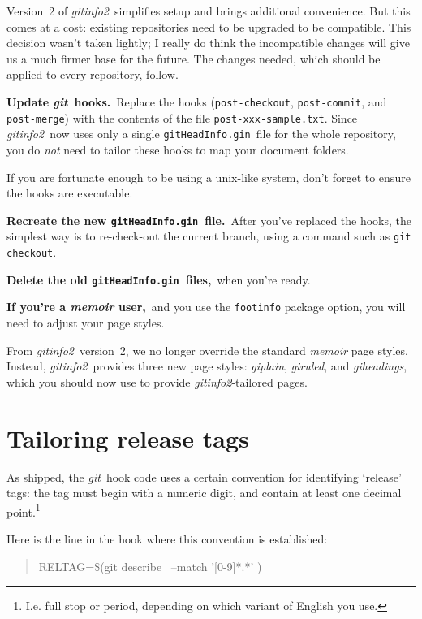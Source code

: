 \documentclass[a4paper,12pt,twoside,openany]{memoir}
\newcommand{\bpara}[1]{\par\vspace{\beforeparaskip}\noindent\textbf{#1}\,}
\newcommand{\sfit}[1]{\textit{#1}}
\newcommand{\git}{\sfit{git}}
\newcommand{\tpname}{\sfit{gitinfo2}}
\newcommand{\ginname}{gitHeadInfo.gin}
\newcommand{\metaname}{\texttt{\ginname}}
\begin{document}
Version~2 of \tpname\ simplifies setup and brings additional convenience.
But this comes at a cost:
existing repositories need to be upgraded to be compatible.
This decision wasn't taken lightly; I really do think the incompatible changes
will give us a much firmer base for the future.
The changes needed, which should be applied to every repository, follow.

\bpara{Update \git\ hooks.}
Replace the hooks (\texttt{post-checkout}, \texttt{post-commit},
and \texttt{post-merge}) with the contents of the file \texttt{post-xxx-sample.txt}.
Since \tpname\ now uses only a single \metaname\ file for the whole repository,
you do \emph{not} need to tailor these hooks to map your document folders.

If you are fortunate enough to be using a unix-like system,
don't forget to ensure the hooks are executable.

\bpara{Recreate the new \metaname\ file.}
After you've replaced the hooks, the simplest way is to re-check-out the current branch,
using a command such as \verb!git checkout!.

\bpara{Delete the old \metaname\ files,}
when you're ready.

\bpara{If you're a \sfit{memoir} user,}
and you use the \texttt{footinfo} package option,
you will need to adjust your page styles.

From \tpname\ version~2, we no longer override the standard \sfit{memoir}
page styles.
Instead, \tpname\ provides three new page styles:
\sfit{giplain}, \sfit{giruled}, and \sfit{giheadings},
which you should now use to provide \tpname-tailored pages.

\section{Tailoring release tags}

As shipped, the \git\ hook code uses a certain convention
for identifying `release' tags:
the tag must begin with a numeric digit, and contain at least one decimal
point.\footnote{I.e. full stop or period, depending on which variant of English you use.}

Here is the line in the hook where this convention is established:

\begin{quotation}
{\ttfamily
RELTAG=\$(git describe \textellipsis\ --match '[0-9]*.*' \textellipsis)
}
\end{quotation}
\end{document}
